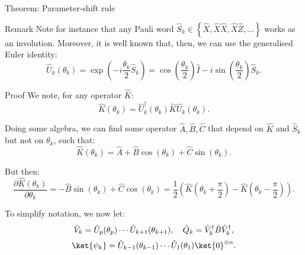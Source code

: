 \documentclass[a4paper]{article}
\begin{document}
\begin{parag}{Theorem: Parameter-shift rule}
    \begin{subparag}{Remark}
        Note for instance that any Pauli word $\hat{S}_k \in \left\{\hat{X}, \hat{X}\hat{X}, \hat{X} \hat{Z}, \ldots\right\}$ works as an involution. Moreover, it is well known that, then, we can use the generalised Euler identity:
        \[\hat{U}_k\left(\theta_k\right) = \exp\left(-i\frac{\theta_k}{2} \hat{S}_k\right) = \cos\left(\frac{\theta_k}{2}\right) \hat{I} - i \sin\left(\frac{\theta_k}{2}\right) \hat{S}_k.\]
    \end{subparag}

    \begin{subparag}{Proof}
        We note, for any operator $\hat{K}$: 
        \[\hat{K}\left(\theta_k\right) = \hat{U}_k^{\dagger}\left(\theta_k\right) \hat{K} \hat{U}_k\left(\theta_k\right).\]

        Doing some algebra, we can find some operator $\hat{A}, \hat{B}, \hat{C}$ that depend on $\hat{K}$ and $\hat{S}_k$ but not on $\theta_k$, such that:  
        \[\hat{K}\left(\theta_k\right) = \hat{A} + \hat{B} \cos\left(\theta_k\right) + \hat{C} \sin\left(\theta_k\right).\]
        
        But then: 
        \[\frac{\partial \hat{K}\left(\theta_k\right)}{\partial \theta_k} = - \hat{B} \sin\left(\theta_k\right) + \hat{C} \cos\left(\theta_k\right) = \frac{1}{2}\left(\hat{K}\left(\theta_k + \frac{\pi}{2}\right) - \hat{K}\left(\theta_k - \frac{\pi}{2}\right)\right).\]

        To simplify notation, we now let: 
        \[\hat{V}_k = \hat{U}_p\left(\theta_p\right) \cdots \hat{U}_{k+1}\left(\theta_{k+1}\right), \mathspace \hat{Q}_k = \hat{V}_k^{\dagger} \hat{B} \hat{V}_k^{\dagger},\]
        \[\ket{\psi_k} = \hat{U}_{k-1}\left(\theta_{k-1}\right) \cdots \hat{U}_1\left(\theta_1\right) \ket{0}^{\otimes n}.\]
        

\end{subparag}
\end{parag}
\end{document}
